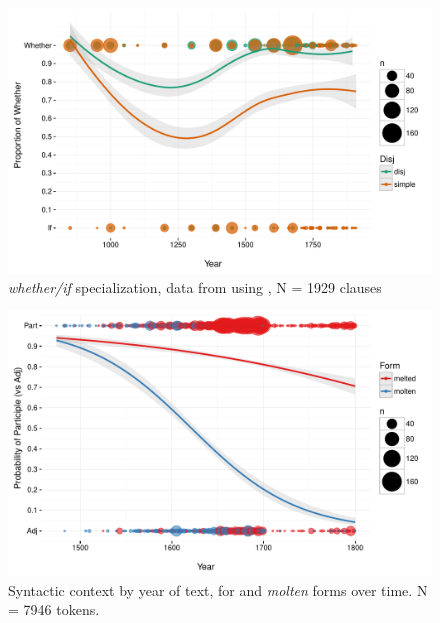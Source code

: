 \documentclass{artikel3}
\begin{document}



%

%
  

\pagebreak 

\begin{figure}
    \begin{center}
    \includegraphics[scale=.6]{whetherifEngWQByYearUnbinned.pdf}
    \caption{\textsl{whether/if} specialization, data from \citet{baileywallenbergwurff2012} using \citet{ycoe,ppcme2,ppceme,ppcmbe}, N = 1929 clauses}
       \label{whether}
    \end{center}
\end{figure}

\begin{figure}
    \begin{center}
    \includegraphics[scale=.6]{ContextByDateUnbinnedWithDots2.pdf}
    \caption{Syntactic context by year of text, for  and \textsl{molten} forms over time. N =  7946 tokens.}
       \label{molten1}
    \end{center}
\end{figure}
\end{document}
